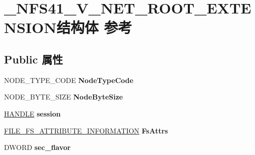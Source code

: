 \hypertarget{struct___n_f_s41___v___n_e_t___r_o_o_t___e_x_t_e_n_s_i_o_n}{}\section{\+\_\+\+N\+F\+S41\+\_\+\+V\+\_\+\+N\+E\+T\+\_\+\+R\+O\+O\+T\+\_\+\+E\+X\+T\+E\+N\+S\+I\+O\+N结构体 参考}
\label{struct___n_f_s41___v___n_e_t___r_o_o_t___e_x_t_e_n_s_i_o_n}
\subsection*{Public 属性}
\begin{DoxyCompactItemize}
\item 
\mbox{\label{struct___n_f_s41___v___n_e_t___r_o_o_t___e_x_t_e_n_s_i_o_n_aa549e08dc0d77f3a2cf8ad4ae76b72de}} 
N\+O\+D\+E\+\_\+\+T\+Y\+P\+E\+\_\+\+C\+O\+DE {\bfseries Node\+Type\+Code}
\item 
\mbox{\label{struct___n_f_s41___v___n_e_t___r_o_o_t___e_x_t_e_n_s_i_o_n_af473ed4caf9d60f71d2591e90959f885}} 
N\+O\+D\+E\+\_\+\+B\+Y\+T\+E\+\_\+\+S\+I\+ZE {\bfseries Node\+Byte\+Size}
\item 
\mbox{\label{struct___n_f_s41___v___n_e_t___r_o_o_t___e_x_t_e_n_s_i_o_n_adf80edd1123cecb0f7553420dcd97e0c}} 
\hyperlink{interfacevoid}{H\+A\+N\+D\+LE} {\bfseries session}
\item 
\mbox{\label{struct___n_f_s41___v___n_e_t___r_o_o_t___e_x_t_e_n_s_i_o_n_ab7b079ba46a3416e0ed7824d2b6297dc}} 
\hyperlink{struct___f_i_l_e___f_s___a_t_t_r_i_b_u_t_e___i_n_f_o_r_m_a_t_i_o_n}{F\+I\+L\+E\+\_\+\+F\+S\+\_\+\+A\+T\+T\+R\+I\+B\+U\+T\+E\+\_\+\+I\+N\+F\+O\+R\+M\+A\+T\+I\+ON} {\bfseries Fs\+Attrs}
\item 
\mbox{\label{struct___n_f_s41___v___n_e_t___r_o_o_t___e_x_t_e_n_s_i_o_n_ae42c35b88638867fa67c2c85f380fa76}} 
D\+W\+O\+RD {\bfseries sec\+\_\+flavor}

\end{DoxyCompactItemize}
